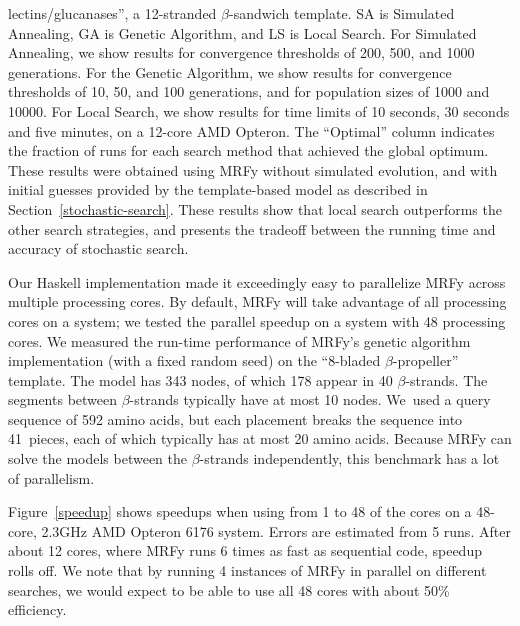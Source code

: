 \documentclass[blockstyle,times,preprint]{sigplanconf}
\begin{document}
\begin{small}
\begin{table}[!t]
{lectins/glucanases'', a 12-stranded $\beta$-sandwich template. 
SA is Simulated Annealing, GA is Genetic Algorithm, and LS is Local
Search. 
For Simulated Annealing, we show results for convergence thresholds of
200, 500, and 1000 generations. 
For the Genetic Algorithm, we show results for convergence thresholds of 10, 
50, and 100 generations, and for population sizes of 1000 and 10000.
For Local Search, we show results for time limits of 10 seconds, 30 seconds and 
five minutes, on a 12-core AMD Opteron.
The ``Optimal'' column indicates the fraction of runs for each search method
that achieved the global optimum.
These results were obtained using MRFy without simulated evolution,
and with initial guesses provided by the template-based model as described in 
Section~\ref{stochastic-search}.
These results show that local search outperforms the other search strategies,
and presents the tradeoff between the running time and accuracy of stochastic 
search.}
\end{table}
\end{small}




Our Haskell implementation made it exceedingly easy to parallelize MRFy across
multiple processing cores.
By default, MRFy will take advantage of all processing cores on a system; we
tested the parallel speedup on a system with 48 processing cores.
We measured the run-time performance of MRFy's genetic algorithm implementation
(with a fixed random seed) on the ``8-bladed $\beta$-propeller'' template.
The model has 343 nodes, of which 178 appear in 40 $\beta$-strands.
The segments between $\beta$-strands typically have at most 10 nodes.
We~used a query sequence of 592 amino acids, but each placement breaks
the sequence into 41~pieces, each of which typically has at most 20 amino
acids.
Because MRFy can solve the models between the $\beta$-strands independently,
this benchmark has a lot of parallelism.

Figure~\ref{speedup} shows speedups when using from 
 1 to 48 of the cores 
on a 48-core, 2.3GHz AMD Opteron 6176 system.
Errors are estimated from 5 runs.
After about 12 cores, where MRFy runs 6 times as fast as sequential code, 
speedup rolls off.
We note that by running 4 instances of MRFy in parallel on different searches,
we would expect to be able to use all 48 cores with about 50\% efficiency.
\end{document}
